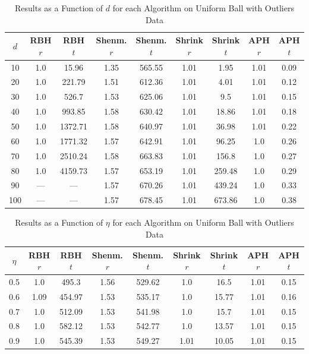 \documentclass[11pt,twoside]{report}
\theoremstyle{definition}
\numberwithin{theorem}{section}
\numberwithin{definition}{section}
\numberwithin{lemma}{section}
\numberwithin{proposition}{section}
\numberwithin{equation}{section}
\numberwithin{figure}{section}
\begin{document}
\begin{appendices}
    \begin{table}[ht]
        \centering
        \begin{tabular}{|c||c|c||c|c||c|c||c|c|} \hline
$d$&RBH $r$&RBH $t$&Shenm. $r$&Shenm. $t$&Shrink $r$&Shrink $t$&APH $r$&APH $t$ \\ \hline
10&1.0&15.96&1.35&565.55&1.01&1.95&1.01&0.09 \\
20&1.0&221.79&1.51&612.36&1.01&4.01&1.01&0.12 \\
30&1.0&526.7&1.53&625.06&1.01&9.5&1.01&0.15 \\
40&1.0&993.85&1.58&630.42&1.01&18.86&1.01&0.18 \\
50&1.0&1372.71&1.58&640.97&1.01&36.98&1.01&0.22 \\
60&1.0&1771.32&1.57&642.91&1.01&96.25&1.0&0.26 \\
70&1.0&2510.24&1.58&663.83&1.01&156.8&1.0&0.27 \\
80&1.0&4159.73&1.57&653.19&1.01&259.48&1.0&0.29 \\
90&---&---&1.57&670.26&1.01&439.24&1.0&0.33 \\
100&---&---&1.57&678.45&1.01&673.86&1.0&0.38 \\ \hline
        \end{tabular}
        \caption{Results as a Function of $d$ for each Algorithm on Uniform Ball with Outliers Data}
        \label{tab:uniform_ball_with_outliers_table_d}
    \end{table}
    
    \begin{table}[ht]
        \centering
        \begin{tabular}{|c||c|c||c|c||c|c||c|c|} \hline
$\eta$&RBH $r$&RBH $t$&Shenm. $r$&Shenm. $t$&Shrink $r$&Shrink $t$&APH $r$&APH $t$ \\ \hline
0.5&1.0&495.3&1.56&529.62&1.0&16.5&1.01&0.15 \\
0.6&1.09&454.97&1.53&535.17&1.0&15.77&1.01&0.16 \\
0.7&1.0&512.09&1.53&541.98&1.0&15.7&1.01&0.15 \\
0.8&1.0&582.12&1.53&542.77&1.0&13.57&1.01&0.15 \\
0.9&1.0&545.39&1.53&549.27&1.01&10.05&1.01&0.15 \\ \hline
        \end{tabular}
        \caption{Results as a Function of $\eta$ for each Algorithm on Uniform Ball with Outliers Data}
        \label{tab:uniform_ball_with_outliers_table_eta}
    \end{table}


\end{appendices}
\end{document}
